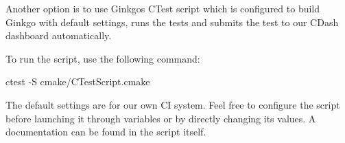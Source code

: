 Another option is to use Ginkgo\textquotesingle{}s C\+Test script which is configured to build Ginkgo with default settings, runs the tests and submits the test to our C\+Dash dashboard automatically.

To run the script, use the following command\+:


\begin{DoxyCode}
ctest -S cmake/CTestScript.cmake
\end{DoxyCode}


The default settings are for our own CI system. Feel free to configure the script before launching it through variables or by directly changing its values. A documentation can be found in the script itself. 